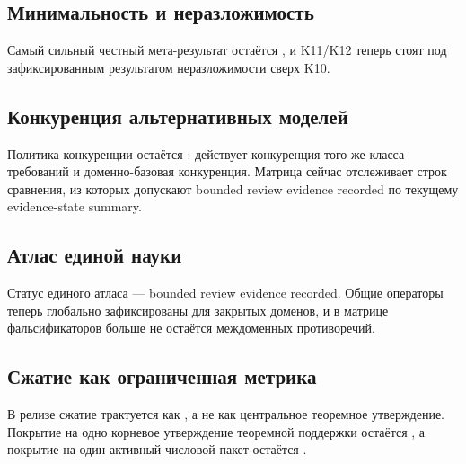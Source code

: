 \subsection{Минимальность и неразложимость}
Самый сильный честный мета-результат остаётся , и K11/K12 теперь стоят под зафиксированным результатом неразложимости сверх K10.

\subsection{Конкуренция альтернативных моделей}
Политика конкуренции остаётся : действует конкуренция того же класса требований и доменно-базовая конкуренция. Матрица сейчас отслеживает  строк сравнения, из которых  допускают bounded review evidence recorded по текущему evidence-state summary.

\subsection{Атлас единой науки}
Статус единого атласа — bounded review evidence recorded. Общие операторы теперь глобально зафиксированы для закрытых доменов, и в матрице фальсификаторов больше не остаётся междоменных противоречий.

\subsection{Сжатие как ограниченная метрика}
В релизе сжатие трактуется как , а не как центральное теоремное утверждение. Покрытие на одно корневое утверждение теоремной поддержки остаётся , а покрытие на один активный числовой пакет остаётся .
